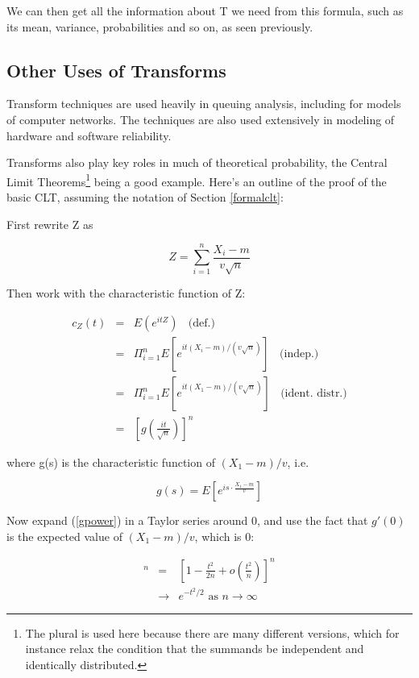 We can then get all the information about T we need from this formula, such
as its mean, variance, probabilities and so on, as seen previously. 

\subsection{Other Uses of Transforms}

Transform techniques are used heavily in queuing analysis, including for
models of computer networks.  The techniques are also used extensively
in modeling of hardware and software reliability.

Transforms also play key roles in much of theoretical probability, the
Central Limit Theorems\footnote{The plural is used here because there
are many different versions, which for instance relax the condition that
the summands be independent and identically distributed.} being a good
example.  Here's an outline of the proof of the basic CLT, assuming the
notation of Section \ref{formalclt}:

First rewrite Z as

\begin{equation}
Z = \sum_{i=1}^n \frac{X_i - m}{v \sqrt{n}}
\end{equation}

Then work with the characteristic function of Z:

\begin{eqnarray}
c_Z(t) &=& E(e^{itZ}) ~~~~ \textrm{(def.)} \\ 
&=& \Pi_{i=1}^n E[e^{it(X_i-m)/(v\sqrt{n})}] ~~~~ \textrm{(indep.)} \\
&=&  \Pi_{i=1}^n E[e^{it(X_1-m)/(v\sqrt{n})}] ~~~~ \textrm{(ident. distr.)} \\
&=& [g(\frac{it}{\sqrt{n}})]^n
\label{gpower}
\end{eqnarray}

where g(s) is the characteristic function of $(X_1-m)/v$, i.e.

\begin{equation}
g(s) = E[e^{is \cdot \frac{X_1 - m}{v}}]
\end{equation}

Now expand (\ref{gpower}) in a Taylor series around 0, and use the fact
that $g'(0)$ is the expected value of $(X_1-m)/v$, which is 0:

\begin{eqnarray}
[g(\frac{t}{\sqrt{n}})]^n 
&=& \left [1 - \frac{t^2}{2n} + o(\frac{t^2}{n}) \right ]^n \\
&\rightarrow& e^{-t^2/2} \textrm{ as } n \rightarrow \infty
\label{ourcltgoal}
\end{eqnarray}

